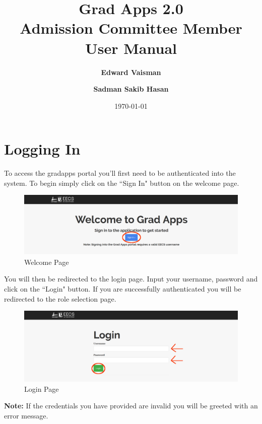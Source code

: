 \documentclass[fontsize=12pt,paper=letter,twoside]{scrartcl}
\author{\textbf{Edward Vaisman}
\and \textbf{Sadman Sakib Hasan}
}
\date{\today} %
\begin{document}
\title{Grad Apps 2.0 \\ Admission Committee Member User Manual}
\maketitle

\newpage

\tableofcontents

\newpage



\clearpage
\section{Logging In}

To access the gradapps portal you'll first need to be authenticated into the system. To begin simply click on the ``Sign In" button on the welcome page.

\begin{figure}[!htb]
\begin{center}
\includegraphics[width=.99\textwidth]{images/welcome.png}
\end{center}
\caption{Welcome Page}
\label{fig:welcome}
\end{figure}

\bigskip

You will then be redirected to the login page. Input your username, password and click on the ``Login" button. If you are successfully authenticated you will be redirected to the role selection page.

\begin{figure}[!htb]
\begin{center}
\includegraphics[width=.99\textwidth]{images/login.png}
\end{center}
\caption{Login Page}
\label{fig:login}
\end{figure}
\noindent \textbf{Note:} If the credentials you have provided are invalid you will be greeted with an error message.
\end{document}
